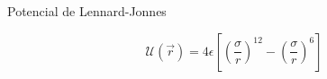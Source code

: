 



Potencial de Lennard-Jonnes

\begin{equation}
    \mathcal{U}(\vec{r}) = 4 \epsilon \left[ \left(\frac{\sigma}{r} \right)^12 - \left(\frac{\sigma}{r}\right)^6 \right]
\end{equation}